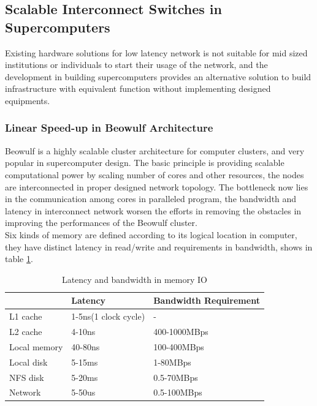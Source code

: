\documentclass[11pt,openright,a4paper]{report}
\begin{document}
\subsection{Scalable Interconnect Switches in Supercomputers}
Existing hardware solutions for low latency network is not suitable for mid sized institutions or individuals to start their usage of the network, and the development in building supercomputers provides an alternative solution to build infrastructure with equivalent function without implementing designed equipments.
\subsubsection{Linear Speed-up in Beowulf Architecture}
Beowulf is a highly scalable cluster architecture for computer clusters, and very popular in supercomputer design\cite{behrooz2005computer}. The basic principle is providing scalable computational power by scaling number of cores and other resources, the nodes are interconnected in proper designed network topology. The bottleneck now lies in the communication among cores in paralleled program\cite{brown2004engineering}, the bandwidth and latency in interconnect network worsen the efforts in removing the obstacles in improving the performances of the Beowulf cluster.\\
Six kinds of memory are defined according to its logical location in computer, they have distinct latency in read/write and requirements in bandwidth, shows in table \ref{table:1}.\\
\begin{table}[htb]
\begin{center}
	\caption{Latency and bandwidth in memory IO}
	\label{table:1}
	\begin{tabular}{lll}
		\hline
		& Latency              & Bandwidth Requirement \\ \hline
		L1 cache     & 1-5ns(1 clock cycle) & -                     \\
		L2 cache     & 4-10ns               & 400-1000MBps          \\
		Local memory & 40-80ns              & 100-400MBps           \\
		Local disk   & 5-15ms               & 1-80MBps              \\
		NFS disk     & 5-20ms               & 0.5-70MBps            \\
		Network      & 5-50us               & 0.5-100MBps           \\ \hline
	\end{tabular}
\end{center}
\end{table}
\end{document}
